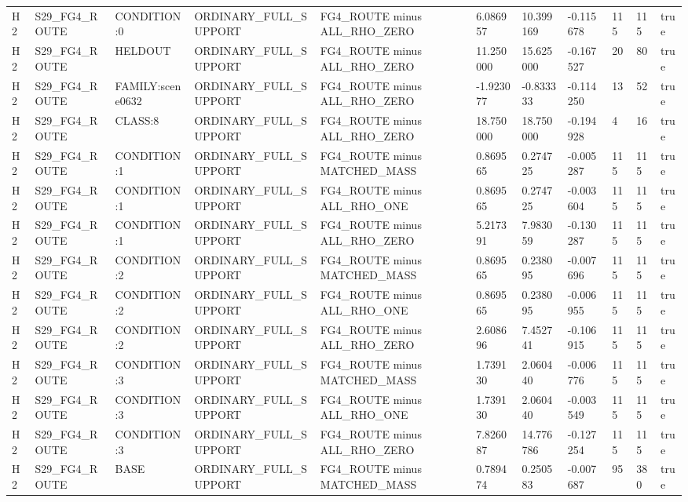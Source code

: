 \begin{tabular}{lllllllllll}
H2 & S29\_FG4\_ROUTE & CONDITION:0 & ORDINARY\_FULL\_SUPPORT & FG4\_ROUTE minus ALL\_RHO\_ZERO & 6.086957 & 10.399169 & -0.115678 & 115 & 115 & true \\
H2 & S29\_FG4\_ROUTE & HELDOUT & ORDINARY\_FULL\_SUPPORT & FG4\_ROUTE minus ALL\_RHO\_ZERO & 11.250000 & 15.625000 & -0.167527 & 20 & 80 & true \\
H2 & S29\_FG4\_ROUTE & FAMILY:scene0632 & ORDINARY\_FULL\_SUPPORT & FG4\_ROUTE minus ALL\_RHO\_ZERO & -1.923077 & -0.833333 & -0.114250 & 13 & 52 & true \\
H2 & S29\_FG4\_ROUTE & CLASS:8 & ORDINARY\_FULL\_SUPPORT & FG4\_ROUTE minus ALL\_RHO\_ZERO & 18.750000 & 18.750000 & -0.194928 & 4 & 16 & true \\
H2 & S29\_FG4\_ROUTE & CONDITION:1 & ORDINARY\_FULL\_SUPPORT & FG4\_ROUTE minus MATCHED\_MASS & 0.869565 & 0.274725 & -0.005287 & 115 & 115 & true \\
H2 & S29\_FG4\_ROUTE & CONDITION:1 & ORDINARY\_FULL\_SUPPORT & FG4\_ROUTE minus ALL\_RHO\_ONE & 0.869565 & 0.274725 & -0.003604 & 115 & 115 & true \\
H2 & S29\_FG4\_ROUTE & CONDITION:1 & ORDINARY\_FULL\_SUPPORT & FG4\_ROUTE minus ALL\_RHO\_ZERO & 5.217391 & 7.983059 & -0.130287 & 115 & 115 & true \\
H2 & S29\_FG4\_ROUTE & CONDITION:2 & ORDINARY\_FULL\_SUPPORT & FG4\_ROUTE minus MATCHED\_MASS & 0.869565 & 0.238095 & -0.007696 & 115 & 115 & true \\
H2 & S29\_FG4\_ROUTE & CONDITION:2 & ORDINARY\_FULL\_SUPPORT & FG4\_ROUTE minus ALL\_RHO\_ONE & 0.869565 & 0.238095 & -0.006955 & 115 & 115 & true \\
H2 & S29\_FG4\_ROUTE & CONDITION:2 & ORDINARY\_FULL\_SUPPORT & FG4\_ROUTE minus ALL\_RHO\_ZERO & 2.608696 & 7.452741 & -0.106915 & 115 & 115 & true \\
H2 & S29\_FG4\_ROUTE & CONDITION:3 & ORDINARY\_FULL\_SUPPORT & FG4\_ROUTE minus MATCHED\_MASS & 1.739130 & 2.060440 & -0.006776 & 115 & 115 & true \\
H2 & S29\_FG4\_ROUTE & CONDITION:3 & ORDINARY\_FULL\_SUPPORT & FG4\_ROUTE minus ALL\_RHO\_ONE & 1.739130 & 2.060440 & -0.003549 & 115 & 115 & true \\
H2 & S29\_FG4\_ROUTE & CONDITION:3 & ORDINARY\_FULL\_SUPPORT & FG4\_ROUTE minus ALL\_RHO\_ZERO & 7.826087 & 14.776786 & -0.127254 & 115 & 115 & true \\
H2 & S29\_FG4\_ROUTE & BASE & ORDINARY\_FULL\_SUPPORT & FG4\_ROUTE minus MATCHED\_MASS & 0.789474 & 0.250583 & -0.007687 & 95 & 380 & true \\

\end{tabular}
